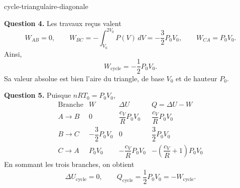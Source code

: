 \begin{exo}{cycle-triangulaire-diagonale}
\begin{solution}
\textbf{Question 4.} Les travaux reçus valent
\[
W_{AB}=0,
\qquad
W_{BC}=-\int_{V_0}^{2V_0}P(V)\,dV=-\frac32P_0V_0,
\qquad
W_{CA}=P_0V_0.
\]
Ainsi,
\[
\boxed{W_{\mathrm{cycle}}=-\frac12P_0V_0}.
\]
Sa valeur absolue est bien l'aire du triangle, de base $V_0$ et de hauteur
$P_0$.

\textbf{Question 5.} Puisque $nRT_0=P_0V_0$,
\[
\begin{array}{c|c|c|c}
\text{Branche} & W & \Delta U & Q=\Delta U-W\\ \hline
A\to B & 0 & \dfrac{c_V}{R}P_0V_0
& \dfrac{c_V}{R}P_0V_0\\[4pt]
B\to C & -\dfrac32P_0V_0 & 0 & \dfrac32P_0V_0\\[4pt]
C\to A & P_0V_0 & -\dfrac{c_V}{R}P_0V_0
& -\left(\dfrac{c_V}{R}+1\right)P_0V_0
\end{array}
\]
En sommant les trois branches, on obtient
\[
\boxed{
\Delta U_{\mathrm{cycle}}=0,
\qquad
Q_{\mathrm{cycle}}=\frac12P_0V_0=-W_{\mathrm{cycle}}.
}
\]
\end{solution}
\end{exo}

